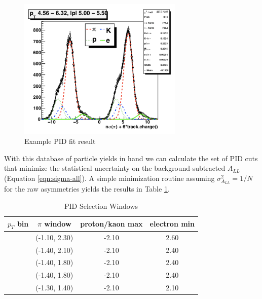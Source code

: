 \begin{figure}
  \begin{center}
    \includegraphics[width=0.7\textwidth]{figures/typical-nsigmapi}    
  \end{center}
  \caption{Example PID fit result}
  \label{fig:typical-nsigmapi}
\end{figure}

With this database of particle yields in hand we can calculate the set of PID
cuts that minimize the statistical uncertainty on the background-subtracted
$A_{LL}$ (Equation \ref{eqn:sigma-all}). A simple minimization routine
assuming $\sigma_{A_{LL}}^{2} = 1/N$ for the raw asymmetries yields the
results in Table \ref{tbl:pid-selection-windows}.

\begin{table}
    \begin{center}
        \begin{tabular}{c|ccc}
        \hline
        $p_{T}$ bin & $\pi$ window & proton/kaon max & electron min\\
        \hline
        \hline
        [2.00 - 3.18] & (-1.10, 2.30) & -2.10 & 2.60\\
        \hline
        [3.18 - 4.56] & (-1.40, 2.10) & -2.10 & 2.40\\
        \hline
        [4.56 - 6.32] & (-1.40, 1.80) & -2.10 & 2.40\\
        \hline
        [6.32 - 8.80] & (-1.40, 1.80) & -2.10 & 2.40\\
        \hline
        [8.80 - 12.84] & (-1.30, 1.40) & -2.10 & 2.10\\
    \hline
    \end{tabular}
    \end{center}
    \caption{PID Selection Windows}
    \label{tbl:pid-selection-windows}
\end{table}
